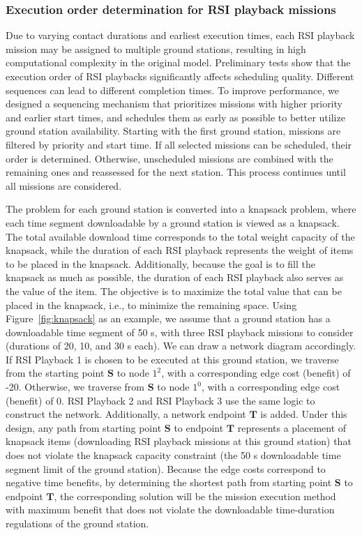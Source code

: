 \documentclass[preprint,3p,12pt,authoryear]{elsarticle}
\begin{document}
\subsubsection{Execution order determination for RSI playback missions}
Due to varying contact durations and earliest execution times, each RSI playback mission may be assigned to multiple ground stations, resulting in high computational complexity in the original model. Preliminary tests show that the execution order of RSI playbacks significantly affects scheduling quality. Different sequences can lead to different completion times. To improve performance, we designed a sequencing mechanism that prioritizes missions with higher priority and earlier start times, and schedules them as early as possible to better utilize ground station availability. Starting with the first ground station, missions are filtered by priority and start time. If all selected missions can be scheduled, their order is determined. Otherwise, unscheduled missions are combined with the remaining ones and reassessed for the next station. This process continues until all missions are considered. 

The problem for each ground station is converted into a knapsack problem, where each time segment downloadable by a ground station is viewed as a knapsack. The total available download time corresponds to the total weight capacity of the knapsack, while the duration of each RSI playback represents the weight of items to be placed in the knapsack. Additionally, because the goal is to fill the knapsack as much as possible, the duration of each RSI playback also serves as the value of the item. The objective is to maximize the total value that can be placed in the knapsack, i.e., to minimize the remaining space. Using Figure~\ref{fig:knapsack} as an example, we assume that a ground station has a downloadable time segment of 50 s, with three RSI playback missions to consider (durations of 20, 10, and 30 s each). We can draw a network diagram accordingly. If RSI Playback 1 is chosen to be executed at this ground station, we traverse from the starting point $\textbf{S}$ to node $1^2$, with a corresponding edge cost (benefit) of -20. Otherwise, we traverse from $\textbf{S}$ to node $1^0$, with a corresponding edge cost (benefit) of 0. RSI Playback 2 and RSI Playback 3 use the same logic to construct the network. Additionally, a network endpoint $\textbf{T}$ is added. Under this design, any path from starting point $\textbf{S}$ to endpoint $\textbf{T}$ represents a placement of knapsack items (downloading RSI playback missions at this ground station) that does not violate the knapsack capacity constraint (the 50 s downloadable time segment limit of the ground station). Because the edge costs correspond to negative time benefits, by determining the shortest path from starting point $\textbf{S}$ to endpoint $\textbf{T}$, the corresponding solution will be the mission execution method with maximum benefit that does not violate the downloadable time-duration regulations of the ground station.
\end{document}
